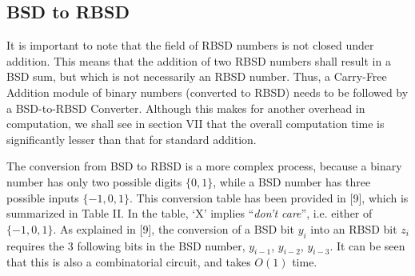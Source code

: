 \documentclass[conference]{IEEEtran}
\begin{document}
\subsection{BSD to RBSD}

It is important to note that the field of RBSD numbers is not closed under addition. This means that the addition of two RBSD numbers shall result in a BSD sum, but which is not necessarily an RBSD number. Thus, a Carry-Free Addition module of binary numbers (converted to RBSD) needs to be followed by a BSD-to-RBSD Converter. Although this makes for another overhead in computation, we shall see in section VII that the overall computation time is significantly lesser than that for standard addition.

The conversion from BSD to RBSD is a more complex process, because a binary number has only two possible digits $\{0, 1\}$, while a BSD number has three possible inputs $\{-1, 0, 1\}$. This conversion table has been provided in [9], which is summarized in Table II. In the table, `X' implies ``\textit{don't care}'', i.e. either of $\{-1, 0, 1\}$. As explained in [9], the conversion of a BSD bit $y_{i}$ into an RBSD bit $z_{i}$ requires the 3 following bits in the BSD number, $y_{i-1}$, $y_{i-2}$, $y_{i-3}$. It can be seen that this is also a combinatorial circuit, and takes $O(1)$ time.
\end{document}
